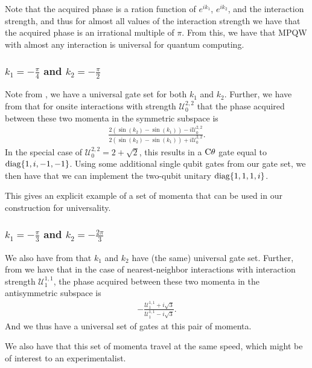 \documentclass[../thesis-main/thesis-main]{subfiles}
\begin{document}
Note that the acquired phase is a ration function of $e^{ik_1}$, $e^{i k_2}$, and the interaction strength, and thus for almost all values of the interaction strength we have that the acquired phase is an irrational multiple of $\pi$.  From this, we have that MPQW with almost any interaction is universal for quantum computing.

\subsubsection{$k_1 = -\frac{\pi}{4}$ and $k_2 = -\frac{\pi}{2}$}

Note from , we have a universal gate set for both $k_1$ and $k_2$.  Further, we have from  that for onsite interactions with strength $\mathcal{U}_{0}^{2,2}$ that the phase acquired between these two momenta in the symmetric subspace is
\begin{align}
  \frac{2 \left(\sin(k_2) - \sin(k_1)\right) - i \mathcal{U}_0^{2,2}}{2 \left(\sin(k_2) - \sin(k_1)\right) + i \mathcal{U}_0^{2,2}}.
\end{align}
In the special case of $\mathcal{U}_{0}^{2,2} = 2 + \sqrt{2}$, this results in a $\mathrm{C}\theta$ gate equal to $\operatorname{diag}\{1,i, -1, -1\}$.  Using some additional single qubit gates from our gate set, we then have that we can implement the two-qubit unitary $\operatorname{diag}\{1,1,1,i\}$.  

This gives an explicit example of a set of momenta that can be used in our construction for universality.

\subsubsection{$k_1 = -\frac{\pi}{3}$ and $k_2 = - \frac{2\pi}{3}$}

We also have from  that $k_1$ and $k_2$ have (the same) universal gate set.  Further, from  we have that in the case of nearest-neighbor interactions with interaction strength $\mathcal{U}_1^{1,1}$, the phase acquired between these two momenta in the antisymmetric subspace is
\begin{align}
  -\frac{\mathcal{U}_1^{1,1} + i \sqrt{3}}{\mathcal{U}_1^{1,1} - i \sqrt{3}}.
\end{align}
And we thus have a universal set of gates at this pair of momenta.

We also have that this set of momenta travel at the same speed, which might be of interest to an experimentalist.
\end{document}
